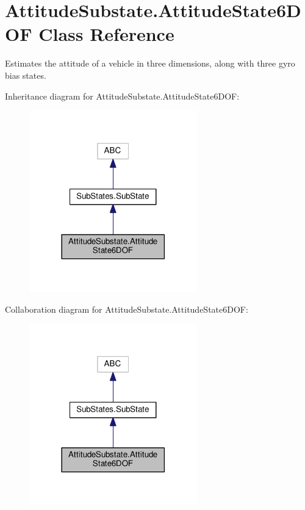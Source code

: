 \hypertarget{classAttitudeSubstate_1_1AttitudeState6DOF}{}\section{Attitude\+Substate.\+Attitude\+State6\+D\+OF Class Reference}
\label{classAttitudeSubstate_1_1AttitudeState6DOF}


Estimates the attitude of a vehicle in three dimensions, along with three gyro bias states.  




Inheritance diagram for Attitude\+Substate.\+Attitude\+State6\+D\+OF\+:
\nopagebreak
\begin{figure}[H]
\begin{center}
\leavevmode
\includegraphics[width=206pt]{classAttitudeSubstate_1_1AttitudeState6DOF__inherit__graph}
\end{center}
\end{figure}


Collaboration diagram for Attitude\+Substate.\+Attitude\+State6\+D\+OF\+:
\nopagebreak
\begin{figure}[H]
\begin{center}
\leavevmode
\includegraphics[width=206pt]{classAttitudeSubstate_1_1AttitudeState6DOF__coll__graph}
\end{center}
\end{figure}
